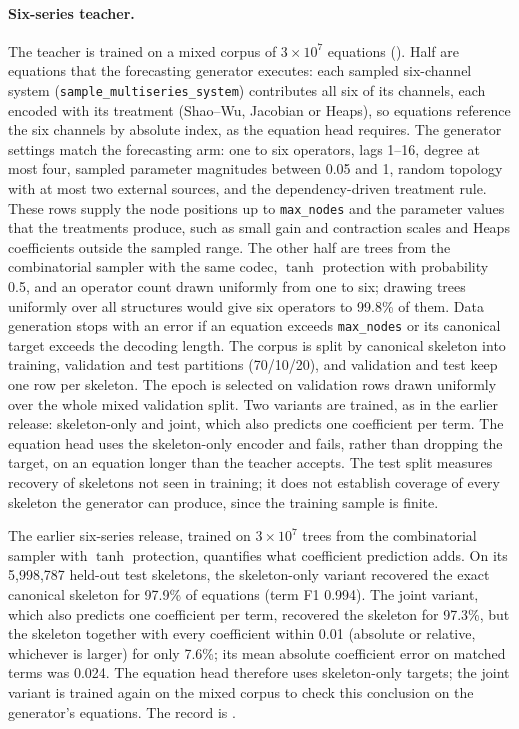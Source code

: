 \paragraph{Six-series teacher.}
The teacher is trained on a mixed corpus of $3\times10^7$ equations
(). Half are equations
that the forecasting generator executes: each sampled six-channel system
(\texttt{sample\_multiseries\_system}) contributes all six of its channels,
each encoded with its treatment (Shao--Wu, Jacobian or Heaps), so equations
reference the six channels by absolute index, as the equation head requires.
The generator settings match the forecasting arm: one to six operators, lags
1--16, degree at most four, sampled parameter magnitudes between 0.05 and 1,
random topology with at most two external sources, and the dependency-driven
treatment rule. These rows supply the node positions up to
\texttt{max\_nodes} and the parameter values that the treatments produce, such
as small gain and contraction scales and Heaps coefficients outside the
sampled range. The other half are trees from the combinatorial sampler with
the same codec, $\tanh$ protection with probability 0.5, and an operator
count drawn uniformly from one to six; drawing trees uniformly over all
structures would give six operators to 99.8\% of them. Data generation stops
with an error if an equation exceeds \texttt{max\_nodes} or its canonical
target exceeds the decoding length. The corpus is split by canonical skeleton
into training, validation and test partitions (70/10/20), and validation and
test keep one row per skeleton. The epoch is selected on validation rows drawn
uniformly over the whole mixed validation split. Two variants are trained, as
in the earlier release: skeleton-only and joint, which also predicts one
coefficient per term. The equation head uses the skeleton-only encoder and
fails, rather than dropping the target, on an equation longer than the
teacher accepts. The test split measures recovery of skeletons not seen in
training; it does not establish coverage of every skeleton the generator can
produce, since the training sample is finite.

The earlier six-series release, trained on $3\times10^7$ trees from the
combinatorial sampler with $\tanh$ protection, quantifies what coefficient
prediction adds. On its 5,998,787 held-out test skeletons, the skeleton-only
variant recovered the exact canonical skeleton for 97.9\% of equations (term
F1 0.994). The joint variant, which also predicts one coefficient per term,
recovered the skeleton for 97.3\%, but the skeleton together with every
coefficient within 0.01 (absolute or relative, whichever is larger) for only 7.6\%;
its mean absolute coefficient error on matched terms was 0.024. The equation head
therefore uses skeleton-only targets; the joint variant is trained again on
the mixed corpus to check this conclusion on the generator's equations. The
record is .


